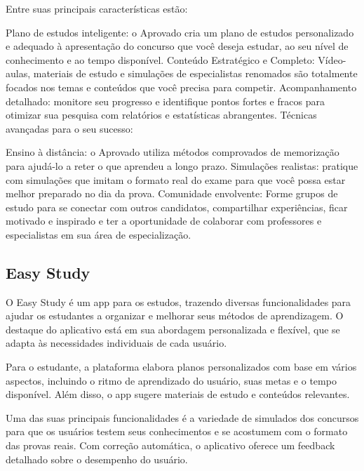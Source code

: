 Entre suas principais características estão:

Plano de estudos inteligente: o Aprovado cria um plano de estudos personalizado e adequado à apresentação do concurso que você deseja estudar, ao seu nível de conhecimento e ao tempo disponível. Conteúdo Estratégico e Completo: Vídeo-aulas, materiais de estudo e simulações de especialistas renomados são totalmente focados nos temas e conteúdos que você precisa para competir. Acompanhamento detalhado: monitore seu progresso e identifique pontos fortes e fracos para otimizar sua pesquisa com relatórios e estatísticas abrangentes. Técnicas avançadas para o seu sucesso:

Ensino à distância: o Aprovado utiliza métodos comprovados de memorização para ajudá-lo a reter o que aprendeu a longo prazo. Simulações realistas: pratique com simulações que imitam o formato real do exame para que você possa estar melhor preparado no dia da prova. Comunidade envolvente: Forme grupos de estudo para se conectar com outros candidatos, compartilhar experiências, ficar motivado e inspirado e ter a oportunidade de colaborar com professores e especialistas em sua área de especialização.

\subsection{Easy Study}

O Easy Study é um app para os estudos, trazendo diversas funcionalidades para ajudar os estudantes a organizar e melhorar seus métodos de aprendizagem. O destaque do aplicativo está em sua abordagem personalizada e flexível, que se adapta às necessidades individuais de cada usuário.

Para o estudante, a plataforma elabora planos personalizados com base em vários aspectos, incluindo o ritmo de aprendizado do usuário, suas metas e o tempo disponível. Além disso, o app sugere materiais de estudo e conteúdos relevantes.

Uma das suas principais funcionalidades é a  variedade de simulados dos concursos para que os usuários testem seus conhecimentos e se acostumem com o formato das provas reais. Com correção automática, o aplicativo oferece um feedback detalhado sobre o desempenho do usuário.

